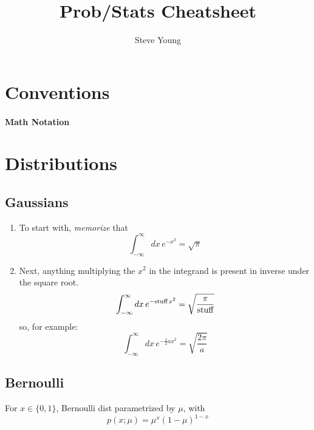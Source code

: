 \documentclass[11pt]{article}
\title{Prob/Stats Cheatsheet}
\author{Steve Young}
\begin{document}
\maketitle

\section{Conventions}
\paragraph{Math Notation}



\section{Distributions}
\subsection{Gaussians}

\begin{enumerate}
  \item To start with, \emph{memorize} that
  \begin{equation}
    \boxed{\int_{-\infty}^{\infty} dx \, e^{-x^2} = \sqrt{\pi}}
  \end{equation}

  \item Next, anything multiplying the $x^2$ in the integrand is present in inverse
  under the square root.
  \begin{equation}
    \int_{-\infty}^{\infty} dx \, e^{-\textrm{stuff}\, x^2} =
    \sqrt{\frac{\pi}{\textrm{stuff}}}
  \end{equation}
  so, for example:
  \begin{equation}
    \int_{-\infty}^{\infty} dx \, e^{-\frac{1}{2} a x^2} =
    \sqrt{\frac{2 \pi}{a}}
  \end{equation}

\end{enumerate}

\subsection{Bernoulli}
For $x \in \{0, 1\}$, Bernoulli dist parametrized by $\mu$, with
\begin{equation}
  p(x; \mu) = \mu^x (1-\mu)^{1-x}
\end{equation}
\end{document}
